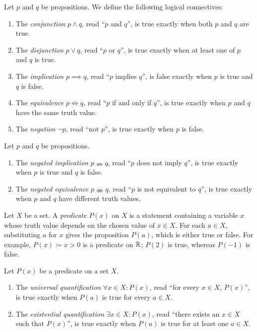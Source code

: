 \documentclass[11pt,a4paper]{amsart}
\begin{document}
\begin{definition}
  Let \(p\) and \(q\) be propositions. We define the following logical
  connectives:
  \begin{enumerate}
    \item The \emph{conjunction} \(p \land q\), read ``\(p\) and \(q\)'', is
      true exactly when both \(p\) and \(q\) are true.
    \item The \emph{disjunction} \(p \lor q\), read ``\(p\) or \(q\)'', is
      true exactly when at least one of \(p\) and \(q\) is true.
    \item The \emph{implication} \(p \implies q\), read ``\(p\) implies
      \(q\)'', is false exactly when \(p\) is true and \(q\) is false.
    \item The \emph{equivalence} \(p \iff q\), read ``\(p\) if and only if
      \(q\)'', is true exactly when \(p\) and \(q\) have the same truth value.
    \item The \emph{negation} \(\neg p\), read ``not \(p\)'', is true exactly
      when \(p\) is false.
  \end{enumerate}
\end{definition}

\begin{definition}
  Let \(p\) and \(q\) be propositions.
  \begin{enumerate}
    \item The \emph{negated implication} \(p \nRightarrow q\), read ``\(p\)
      does not imply \(q\)'', is true exactly when \(p\) is true and \(q\) is
      false.
    \item The \emph{negated equivalence} \(p \nLeftrightarrow q\), read
      ``\(p\) is not equivalent to \(q\)'', is true exactly when \(p\) and
      \(q\) have different truth values.
  \end{enumerate}
\end{definition}

\begin{definition}
  Let \(X\) be a set. A \emph{predicate} \(P(x)\) on \(X\) is a statement
  containing a variable \(x\) whose truth value depends on the chosen value of
  \(x \in X\). For each \(a \in X\), substituting \(a\) for \(x\) gives the
  proposition \(P(a)\), which is either true or false. For example,
  \(P(x) \coloneqq x > 0\) is a predicate on \(\mathbb{R}\); \(P(2)\) is true, whereas
  \(P(-1)\) is false.
\end{definition}

\begin{definition}
  Let \(P(x)\) be a predicate on a set \(X\).
  \begin{enumerate}
    \item The \emph{universal quantification}
      \(\forall x \in X \colon P(x)\), read ``for every \(x \in X\),
      \(P(x)\)'', is true exactly when \(P(a)\) is true for every \(a \in X\).
    \item The \emph{existential quantification}
      \(\exists x \in X \colon P(x)\), read ``there exists an \(x \in X\) such
      that \(P(x)\)'', is true exactly when \(P(a)\) is true for at least one
      \(a \in X\).
  \end{enumerate}
\end{definition}
\end{document}
